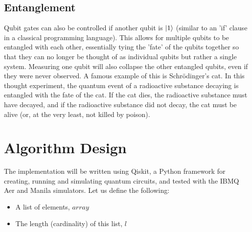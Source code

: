 \documentclass[12pt]{article}
\begin{document}
\subsection{Entanglement}
Qubit gates can also be controlled if another qubit is $\ket{1}$ (similar to an 'if' clause in a classical programming language). This allows for multiple qubits to be entangled with each other, essentially tying the 'fate' of the qubits together so that they can no longer be thought of as individual qubits but rather a single system. Measuring one qubit will also collapse the other entangled qubits, even if they were never observed. A famous example of this is Schr\"odinger's cat. In this thought experiment, the quantum event of a radioactive substance decaying is entangled with the fate of the cat. If the cat dies, the radioactive substance must have decayed, and if the radioactive substance did not decay, the cat must be alive (or, at the very least, not killed by poison).

\section{Algorithm Design}
The implementation will be written using Qiskit, a Python framework for creating, running and simulating quantum circuits, and tested with the IBMQ Aer and Manila simulators.
Let us define the following:

\begin{itemize}
    \item A list of elements, $array$
    \item The length (cardinality) of this list, $l$
\end{itemize}
\end{document}

